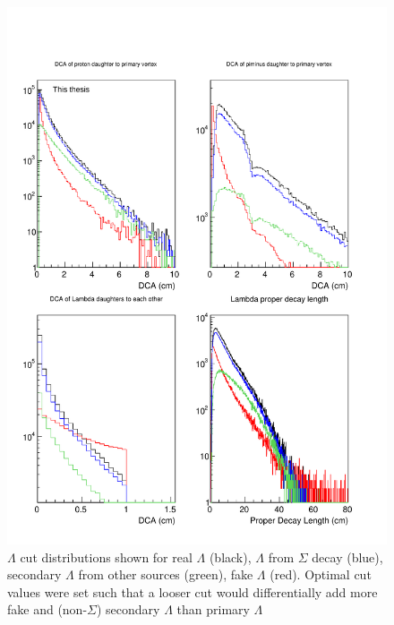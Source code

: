 \begin{figure}
\includegraphics[width=36pc]{Figures/2014-03-31-Distribution-Lambda-4Types-DCA-DCA-DCA-DecayLength.pdf}
\caption[$\Lambda$ cut distributions]{$\Lambda$ cut distributions shown for real $\Lambda$ (black), $\Lambda$ from $\Sigma$ decay (blue), secondary $\Lambda$ from other sources (green), fake $\Lambda$ (red). 
Optimal cut values were set such that a looser cut would differentially add more fake and (non-$\Sigma$) secondary $\Lambda$ than primary $\Lambda$}
\label{fig:LambdaCutDists2}
\end{figure}

